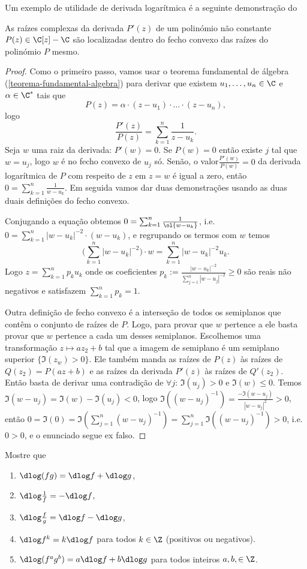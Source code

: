 Um exemplo de utilidade de derivada logarítmica é a seguinte demonstração do
\begin{teorema}
As raízes complexas da derivada $P'(z)$ de um polinómio não constante $P(z)\in\C[z]-\C$
são localizadas dentro
do fecho convexo das raízes do polinómio $P$ mesmo.
\end{teorema}
\begin{proof}
Como o primeiro passo, vamos usar o teorema fundamental de álgebra (\cref{teorema-fundamental-algebra})
para derivar que existem $u_1,\dots,u_n \in \C$ e $\alpha \in \C^*$ tais que
\[ P(z) = \alpha \cdot (z-u_1) \cdot \dots \cdot (z-u_n),\]
logo
\[ \frac{P'(z)}{P(z)} = \sum_{k=1}^n \frac{1}{z-u_k} . \]
Seja $w$ uma raiz da derivada: $P'(w)=0$. Se $P(w)=0$ então existe $j$ tal que $w=u_j$,
logo $w$ é no fecho convexo de $u_j$ só. Senão, o valor$\frac{P'(w)}{P(w)} = 0$
da derivada logarítmica de $P$ com respeito de $z$ em $z=w$ é igual a zero, então
$0 = \sum_{k=1}^n \frac{1}{w-u_k}$.
Em seguida vamos dar duas demonstrações usando as duas duais definições do fecho convexo.

Conjugando a equação obtemos $0 = \sum_{k=1}^n \frac{1}{\ol{w-u_k}}$,
i.e. $0 = \sum_{k=1}^n |w-u_k|^{-2}\cdot (w-u_k)$,
e regrupando os termos com $w$ temos
\[ \big(\sum_{k=1}^n |w-u_k|^{-2}\big) \cdot w = \sum_{k=1}^n |w-u_k|^{-2} u_k. \]
Logo $z = \sum_{k=1}^n p_k u_k$
onde os coeficientes
$p_k := \frac{|w-u_k|^{-2}}{\sum_{j=1}^n |w-u_j|^{-2}} \geq 0$
são reais não negativos e satisfazem $\sum_{k=1}^n p_k = 1$.

Outra definição de fecho convexo é a interseção de todos os semiplanos que contêm o conjunto de raízes de $P$.
Logo, para provar que $w$ pertence a ele basta provar que $w$ pertence a cada um desses semiplanos.
Escolhemos uma transformação $z\mapsto a z_2 + b$ tal que a imagem de semiplano é um semiplano superior
$\{\Im(z_w)>0\}$.
Ele também manda as raízes de $P(z)$ às raízes de $Q(z_2) = P(az+b)$ e as raízes da derivada
$P'(z)$ às raízes de $Q'(z_2)$. Então basta de derivar uma contradição de $\forall j:\,\Im(u_j)>0$
e $\Im(w)\leq 0$. Temos $\Im(w-u_j) = \Im(w)-\Im(u_j)<0$,
logo $\Im((w-u_j)^{-1}) = \frac{-\Im(w-u_j)}{|w-u_j|^2} > 0$,
então $0 = \Im(0) = \Im(\sum_{j=1}^n (w-u_j)^{-1}) = \sum_{j=1}^n \Im((w-u_j)^{-1}) > 0$, i.e. $0>0$,
e o enunciado segue ex falso.
\end{proof}

\begin{problema}
\label{p:dlog-homomorfismo}
Mostre que
\begin{enumerate}
\item $\dlog (fg) = \dlog f + \dlog g$,
\item $\dlog \frac{1}{f} = -\dlog f$,
\item $\dlog \frac{f}{g} = \dlog f - \dlog g$,
\item $\dlog f^k = k \dlog f$ para todos $k\in\Z$ (positivos ou negativos).
\item $\dlog (f^a g^b) = a \dlog f + b \dlog g$ para todos inteiros $a,b,\in\Z$.
\end{enumerate}
\end{problema}

